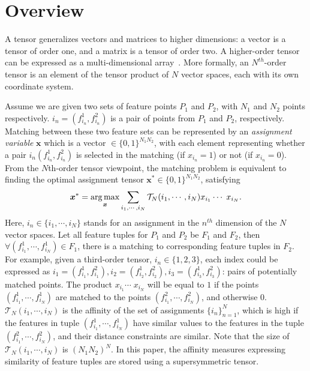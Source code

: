 \section{Overview}
\label{sec:overview}

A tensor generalizes vectors and matrices to higher dimensions: a vector is a tensor of order one,
and a matrix is a tensor of order two. A higher-order tensor can be expressed as a multi-dimensional array~\cite{Kolda08}.
More formally, an $N^{th}$-order tensor is an element of the tensor product of $N$ vector spaces, each with its own coordinate system.

Assume we are given two sets of feature points $P_1$ and $P_2$, with $N_1$ and $N_2$ points respectively.
$i_n = (f^1_{i_n}, f^2_{i_n})$ is a pair of points from $P_1$ and $P_2$, respectively.
Matching between these two feature sets can be represented by an \emph{assignment variable} $\boldsymbol{x}$ which is a vector $\in \{0,1\}^{N_1 N_2}$, with each element representing
whether a pair $i_n(f^1_{i_n}, f^2_{i_n})$ is selected in the matching (if $x_{i_n} = 1$) or not (if $x_{i_n} = 0$).
From the $N$th-order tensor viewpoint,
the matching problem is equivalent to finding the optimal assignment tensor ${\boldsymbol{x}}^*
 \in \{0,1\}^{N_1 N_2}$, satisfying~\cite{Kolda08}
\begin{equation}
\label{equ:assigment}
  {\boldsymbol{x}}^* = \operatorname*{arg\,max}_{\boldsymbol{x}}  \sum_{i_1,\cdots,i_N} \mathcal{T}_N(i_1,\cdots,i_N) x_{i_1}  \cdots\; x_{i_N}.
\end{equation}
Here, $i_n \in \{i_1,\cdots ,i_N\}$ stands for an assignment in the $n^{th}$ dimension of the $N$ vector spaces.
Let all feature tuples for $P_1$ and $P_2$ be $F_1$ and $F_2$, then $\forall (f_{i_1}^1, \cdots, f_{i_N}^1)\in F_1$,
there is a matching to corresponding feature tuples in $F_2$.
For example, given a third-order tensor, $i_n \in \{1,2,3\}$,
each index could be expressed as $i_1=(f_{i_1}^1,f_{i_1}^2), i_2=(f_{i_2}^1,f_{i_2}^2), i_3=(f_{i_3}^1,f_{i_3}^2)$: pairs of potentially matched points.
The product $x_{i_1} \cdots\;x_{i_N}$ will be equal to $1$ if the points $(f_{i_1}^1, \cdots, f_{i_N}^1)$ are matched to the points $(f_{i_1}^2, \cdots, f_{i_N}^2)$,
and otherwise 0.
$\mathcal{T}_N(i_1,\cdots,i_N)$ is the affinity of the set of assignments $\{i_n\}_{n=1}^N$,
which is high if the features in tuple $(f_{i_1}^1, \cdots, f_{i_N}^1)$  have similar values to the features in the tuple $(f_{i_1}^2, \cdots, f_{i_N}^2)$,
and their distance constraints are similar.
Note that the size of $\mathcal{T}_N(i_1,\cdots,i_N)$ is ${(N_1N_2)}^N$.
In this paper, the affinity measures expressing similarity of feature tuples are stored using a supersymmetric tensor.


